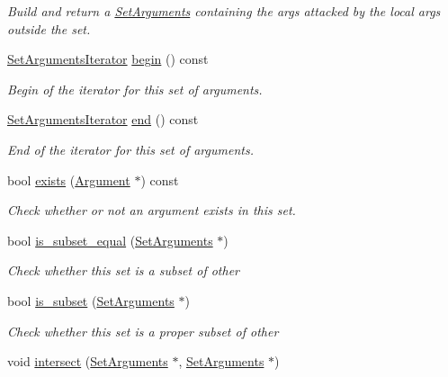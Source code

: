 \begin{DoxyCompactItemize}
\begin{DoxyCompactList}\small\item\em Build and return a \hyperlink{classSetArguments}{Set\-Arguments} containing the args attacked by the local args outside the set. \end{DoxyCompactList}\item 
\hyperlink{classSetArgumentsIterator}{Set\-Arguments\-Iterator} \hyperlink{classSetArguments_aaee058feaed861edf27739fa04f374ef}{begin} () const 
\begin{DoxyCompactList}\small\item\em Begin of the iterator for this set of arguments. \end{DoxyCompactList}\item 
\hyperlink{classSetArgumentsIterator}{Set\-Arguments\-Iterator} \hyperlink{classSetArguments_a551272d71c803f64efc155b04f41e775}{end} () const 
\begin{DoxyCompactList}\small\item\em End of the iterator for this set of arguments. \end{DoxyCompactList}\item 
bool \hyperlink{classSetArguments_a64faa4938649c26acdfddd41da5af333}{exists} (\hyperlink{classArgument}{Argument} $\ast$) const 
\begin{DoxyCompactList}\small\item\em Check whether or not an argument exists in this set. \end{DoxyCompactList}\item 
bool \hyperlink{classSetArguments_a097087545407fc1eac981e31786e8168}{is\-\_\-subset\-\_\-equal} (\hyperlink{classSetArguments}{Set\-Arguments} $\ast$)
\begin{DoxyCompactList}\small\item\em Check whether this set is a subset of {\ttfamily other} \end{DoxyCompactList}\item 
bool \hyperlink{classSetArguments_a3d0a8527f2fa9ad3a888eb387c980a78}{is\-\_\-subset} (\hyperlink{classSetArguments}{Set\-Arguments} $\ast$)
\begin{DoxyCompactList}\small\item\em Check whether this set is a proper subset of {\ttfamily other} \end{DoxyCompactList}\item 
void \hyperlink{classSetArguments_ae6761b6c360e440de55c2060ae70981c}{intersect} (\hyperlink{classSetArguments}{Set\-Arguments} $\ast$, \hyperlink{classSetArguments}{Set\-Arguments} $\ast$)

\end{DoxyCompactItemize}
